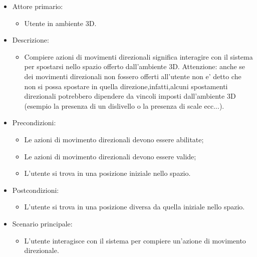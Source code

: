 \begin{itemize}

	\item Attore primario: 
	\begin{itemize}
		\item Utente in ambiente 3D.
	\end{itemize}
	\item Descrizione:
	\begin{itemize}
		\item Compiere azioni di movimenti direzionali significa interagire con il sistema per spostarsi nello spazio offerto dall'ambiente 3D.
\newline Attenzione: anche se dei movimenti direzionali non fossero offerti all'utente non e' detto che non si possa spostare in quella direzione,infatti,alcuni spostamenti direzionali potrebbero dipendere da vincoli imposti dall'ambiente 3D (esempio la presenza di un dislivello o la presenza di scale ecc...).
	\end{itemize}
	
	\item Precondizioni:
	\begin{itemize}
		\item Le azioni di movimento direzionali devono essere abilitate;
		\item Le azioni di movimento direzionali devono essere valide;
		\item L'utente si trova in una posizione iniziale nello spazio.
	\end{itemize}
	
	\item Postcondizioni:
	\begin{itemize}
		\item L'utente si trova in una posizione diversa da quella iniziale nello spazio.
	\end{itemize}
	
	\item Scenario principale:
	\begin{itemize}
		\item L'utente interagisce con il sistema per compiere un'azione di movimento direzionale.
	\end{itemize}
	
\end{itemize}

